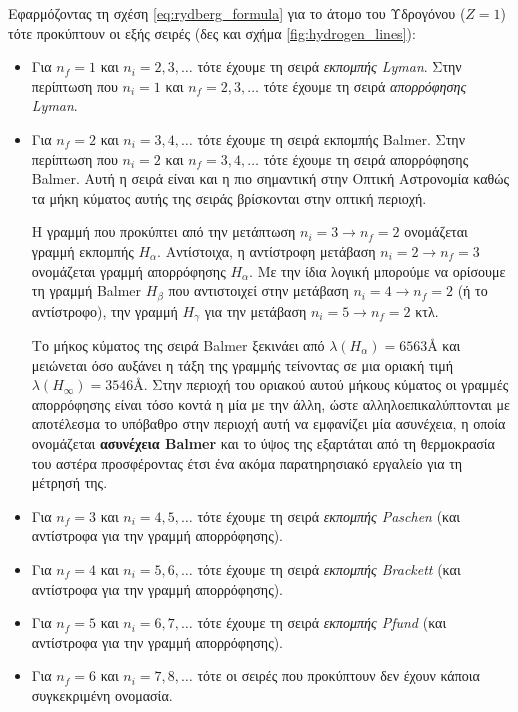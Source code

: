 Εφαρμόζοντας τη σχέση \eqref{eq:rydberg_formula} για το άτομο του Υδρογόνου ($Z=1$) τότε προκύπτουν οι εξής σειρές (δες και σχήμα \ref{fig:hydrogen_lines}):

\begin{itemize}
    \item Για $n_f = 1$ και $n_i=2,3, \dots$ τότε έχουμε τη σειρά \textit{εκπομπής Lyman}. Στην περίπτωση που $n_i = 1$ και $n_f = 2,3, \dots$ τότε έχουμε τη σειρά \textit{απορρόφησης Lyman}.
    \item Για $n_f = 2$ και $n_i=3,4, \dots$ τότε έχουμε τη σειρά εκπομπής Balmer. Στην περίπτωση που $n_i = 2$ και $n_f = 3,4, \dots$ τότε έχουμε τη σειρά απορρόφησης Balmer. Αυτή η σειρά είναι και η πιο σημαντική στην Οπτική Αστρονομία καθώς τα μήκη κύματος αυτής της σειράς βρίσκονται στην οπτική περιοχή. 
    
    Η γραμμή που προκύπτει από την μετάπτωση $n_i = 3 \rightarrow n_f = 2$ ονομάζεται γραμμή εκπομπής $H_{\alpha}$. Αντίστοιχα, η αντίστροφη μετάβαση $n_i = 2 \rightarrow n_f = 3$ ονομάζεται γραμμή απορρόφησης $H_{\alpha}$. Με την ίδια λογική μπορούμε να ορίσουμε τη γραμμή Balmer $H_{\beta}$ που αντιστοιχεί στην μετάβαση $n_i = 4 \rightarrow n_f = 2$ (ή το αντίστροφο), την γραμμή $H_{\gamma}$ για την μετάβαση $n_i = 5 \rightarrow n_f = 2$ κτλ.
    
    Το μήκος κύματος της σειρά Balmer ξεκινάει από $\lambda(H_{\alpha}) = 6563$Å και μειώνεται όσο αυξάνει η τάξη της γραμμής τείνοντας σε μια οριακή τιμή $\lambda(H_{\infty}) = 3546$Å. Στην περιοχή του οριακού αυτού μήκους κύματος οι γραμμές απορρόφησης είναι τόσο κοντά η μία με την άλλη, ώστε αλληλοεπικαλύπτονται με αποτέλεσμα το υπόβαθρο στην περιοχή αυτή να εμφανίζει μία ασυνέχεια, η οποία ονομάζεται \textbf{ασυνέχεια Balmer} και το ύψος της εξαρτάται από τη θερμοκρασία του αστέρα προσφέροντας έτσι ένα ακόμα παρατηρησιακό εργαλείο για τη μέτρησή της. 
    \item Για $n_f = 3$ και $n_i=4,5, \dots$ τότε έχουμε τη σειρά \textit{εκπομπής Paschen} (και αντίστροφα για την γραμμή απορρόφησης).
    \item Για $n_f = 4$ και $n_i=5,6, \dots$ τότε έχουμε τη σειρά \textit{εκπομπής Brackett} (και αντίστροφα για την γραμμή απορρόφησης).
    \item Για $n_f = 5$ και $n_i=6,7, \dots$ τότε έχουμε τη σειρά \textit{εκπομπής Pfund} (και αντίστροφα για την γραμμή απορρόφησης).
    \item Για $n_f = 6$ και $n_i=7,8, \dots$ τότε οι σειρές που προκύπτουν δεν έχουν κάποια συγκεκριμένη ονομασία.
\end{itemize}


